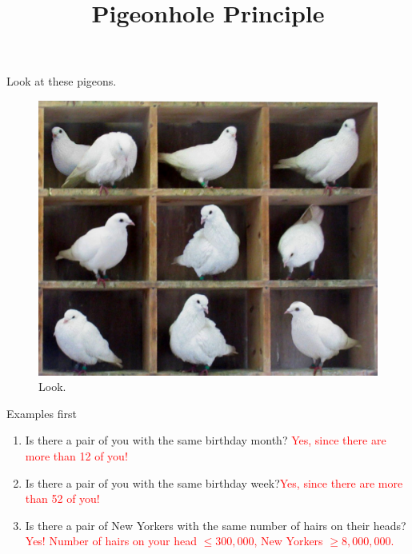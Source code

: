 \documentclass[dvipsnames]{beamer}
\title[The Pigeonhole Principle]{Pigeonhole Principle}
\author{\empty}
\institute{CMSC250}
\date{\empty}
\newcommand\myoutlineslide{
	\begin{frame}{Outline}
		\tableofcontents
	\end{frame}
}
\newcommand{\?}{\textcolor{red}{\textbf{?}}}
\begin{document}
\maketitle

\begin{frame}{Look at these pigeons.}
\begin{figure}
	\includegraphics[scale=.17]{img/TooManyPigeons}
	\caption{Look.}
	\label{fig:pigeons}
\end{figure}
\end{frame}

\begin{frame}{Examples first}
\begin{enumerate}
	\item Is there a pair of you with the same birthday month? \pause \textcolor{red}{Yes, since there are more than 12 of you!}
	\item Is there a pair of you with the same birthday week?\pause \textcolor{red}{Yes, since there are more than 52 of you!}
	\item Is there a pair of New Yorkers with the same number of hairs on their heads? \pause \textcolor{red}{Yes! Number of hairs on your head $\leq  300,000$, New Yorkers $\geq 8,000,000$.}
\end{enumerate}

\end{frame}
\end{document}
